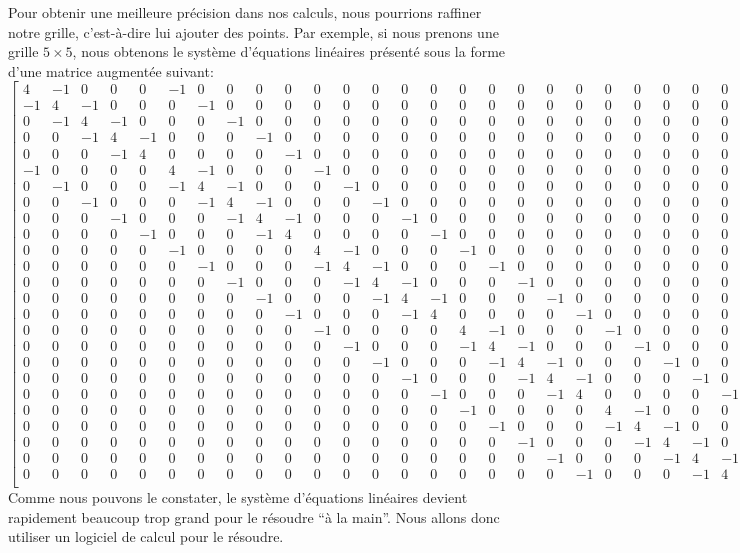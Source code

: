\documentclass[]{book}
\theoremstyle{definition}
\theoremstyle{definition}
\theoremstyle{definition}
\theoremstyle{remark}
\begin{document}
Pour obtenir une meilleure précision dans nos calculs, nous pourrions raffiner notre grille, c'est-à-dire lui ajouter des points. Par exemple, si nous prenons une grille \(5\times 5\),
nous obtenons le système d'équations linéaires présenté sous la forme d'une matrice augmentée suivant:
\[
\left[
\begin{smallmatrix}
4&-1&0&0&0&-1&0&0&0&0&0&0&0&0&0&0&0&0&0&0&0&0&0&0&0&250\\
-1&4&-1&0&0&0&-1&0&0&0&0&0&0&0&0&0&0&0&0&0&0&0&0&0&0&140\\
0&-1&4&-1&0&0&0&-1&0&0&0&0&0&0&0&0&0&0&0&0&0&0&0&0&0&140\\
0&0&-1&4&-1&0&0&0&-1&0&0&0&0&0&0&0&0&0&0&0&0&0&0&0&0&140\\
0&0&0&-1&4&0&0&0&0&-1&0&0&0&0&0&0&0&0&0&0&0&0&0&0&0&260\\
-1&0&0&0&0&4&-1&0&0&0&-1&0&0&0&0&0&0&0&0&0&0&0&0&0&0&110\\
0&-1&0&0&0&-1&4&-1&0&0&0&-1&0&0&0&0&0&0&0&0&0&0&0&0&0&0\\
0&0&-1&0&0&0&-1&4&-1&0&0&0&-1&0&0&0&0&0&0&0&0&0&0&0&0&0\\
0&0&0&-1&0&0&0&-1&4&-1&0&0&0&-1&0&0&0&0&0&0&0&0&0&0&0&0\\
0&0&0&0&-1&0&0&0&-1&4&0&0&0&0&-1&0&0&0&0&0&0&0&0&0&0&120\\
0&0&0&0&0&-1&0&0&0&0&4&-1&0&0&0&-1&0&0&0&0&0&0&0&0&0&110\\
0&0&0&0&0&0&-1&0&0&0&-1&4&-1&0&0&0&-1&0&0&0&0&0&0&0&0&0\\
0&0&0&0&0&0&0&-1&0&0&0&-1&4&-1&0&0&0&-1&0&0&0&0&0&0&0&0\\
0&0&0&0&0&0&0&0&-1&0&0&0&-1&4&-1&0&0&0&-1&0&0&0&0&0&0&0\\
0&0&0&0&0&0&0&0&0&-1&0&0&0&-1&4&0&0&0&0&-1&0&0&0&0&0&120\\
0&0&0&0&0&0&0&0&0&0&-1&0&0&0&0&4&-1&0&0&0&-1&0&0&0&0&110\\
0&0&0&0&0&0&0&0&0&0&0&-1&0&0&0&-1&4&-1&0&0&0&-1&0&0&0&0\\
0&0&0&0&0&0&0&0&0&0&0&0&-1&0&0&0&-1&4&-1&0&0&0&-1&0&0&0\\
0&0&0&0&0&0&0&0&0&0&0&0&0&-1&0&0&0&-1&4&-1&0&0&0&-1&0&0\\
0&0&0&0&0&0&0&0&0&0&0&0&0&0&-1&0&0&0&-1&4&0&0&0&0&-1&120\\
0&0&0&0&0&0&0&0&0&0&0&0&0&0&0&-1&0&0&0&0&4&-1&0&0&0&240\\
0&0&0&0&0&0&0&0&0&0&0&0&0&0&0&0&-1&0&0&0&-1&4&-1&0&0&130\\
0&0&0&0&0&0&0&0&0&0&0&0&0&0&0&0&0&-1&0&0&0&-1&4&-1&0&130\\
0&0&0&0&0&0&0&0&0&0&0&0&0&0&0&0&0&0&-1&0&0&0&-1&4&-1&130\\
0&0&0&0&0&0&0&0&0&0&0&0&0&0&0&0&0&0&0&-1&0&0&0&-1&4&250\\
\end{smallmatrix}
\right]
\]
Comme nous pouvons le constater, le système d'équations linéaires devient rapidement beaucoup trop grand pour le résoudre ``à la main''. Nous allons donc utiliser un logiciel de calcul pour le résoudre.
\end{document}
